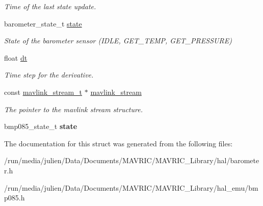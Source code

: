 \begin{DoxyCompactItemize}
\begin{DoxyCompactList}\small\item\em Time of the last state update. \end{DoxyCompactList}\item 
\hypertarget{structbarometer__t_a9a063128db122b722f9db09df2d8d1be}{barometer\+\_\+state\+\_\+t \hyperlink{structbarometer__t_a9a063128db122b722f9db09df2d8d1be}{state}}\label{structbarometer__t_a9a063128db122b722f9db09df2d8d1be}

\begin{DoxyCompactList}\small\item\em State of the barometer sensor (I\+D\+L\+E, G\+E\+T\+\_\+\+T\+E\+M\+P, G\+E\+T\+\_\+\+P\+R\+E\+S\+S\+U\+R\+E) \end{DoxyCompactList}\item 
\hypertarget{structbarometer__t_afe1383365d03ccc403ef6541409b5291}{float \hyperlink{structbarometer__t_afe1383365d03ccc403ef6541409b5291}{dt}}\label{structbarometer__t_afe1383365d03ccc403ef6541409b5291}

\begin{DoxyCompactList}\small\item\em Time step for the derivative. \end{DoxyCompactList}\item 
\hypertarget{structbarometer__t_a0d593893d850c90fde9cf4441dd8588b}{const \hyperlink{structmavlink__stream__t}{mavlink\+\_\+stream\+\_\+t} $\ast$ \hyperlink{structbarometer__t_a0d593893d850c90fde9cf4441dd8588b}{mavlink\+\_\+stream}}\label{structbarometer__t_a0d593893d850c90fde9cf4441dd8588b}

\begin{DoxyCompactList}\small\item\em The pointer to the mavlink stream structure. \end{DoxyCompactList}\item 
\hypertarget{structbarometer__t_a1f03bc0af5420c876a1c366e25ab385b}{bmp085\+\_\+state\+\_\+t {\bfseries state}}\label{structbarometer__t_a1f03bc0af5420c876a1c366e25ab385b}

\end{DoxyCompactItemize}


The documentation for this struct was generated from the following files\+:\begin{DoxyCompactItemize}
\item 
/run/media/julien/\+Data/\+Documents/\+M\+A\+V\+R\+I\+C/\+M\+A\+V\+R\+I\+C\+\_\+\+Library/hal/barometer.\+h\item 
/run/media/julien/\+Data/\+Documents/\+M\+A\+V\+R\+I\+C/\+M\+A\+V\+R\+I\+C\+\_\+\+Library/hal\+\_\+emu/bmp085.\+h\end{DoxyCompactItemize}
